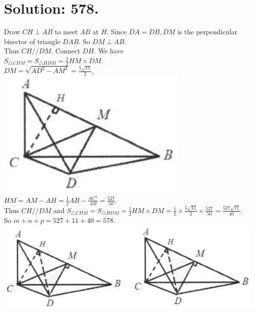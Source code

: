 \documentclass[10pt]{article}
\begin{document}
\section*{Solution: 578.}
Draw \(C H \perp A B\) to meet \(A B\) at \(H\). Since \(D A=D B, D M\) is the perpendicular bisector of triangle \(D A B\). So \(D M \perp A B\).\\
Thus \(C H / / D M\). Connect \(D H\). We have\\
\(S_{\triangle C D M}=S_{\triangle H D M}=\frac{1}{2} H M \times D M\).\\
\(D M=\sqrt{A D^{2}-A M^{2}}=\frac{5 \sqrt{11}}{2}\),\\
\includegraphics[max width=\textwidth, center]{2025_04_17_97bc1f7e44d93c271a88g-086(1)}\\
\(H M=A M-A H=\frac{1}{2} A B-\frac{A C^{2}}{A B}=\frac{527}{50}\).\\
Thus \(C H / / D M\) and \(S_{\triangle C D M}=S_{\triangle H D M}=\frac{1}{2} H M \times D M=\frac{1}{2} \times \frac{5 \sqrt{11}}{2} \times \frac{527}{50}=\frac{527 \sqrt{11}}{40}\).\\
So \(m+n+p=527+11+40=578\).\\
\includegraphics[max width=\textwidth, center]{2025_04_17_97bc1f7e44d93c271a88g-086(2)}
\end{document}
